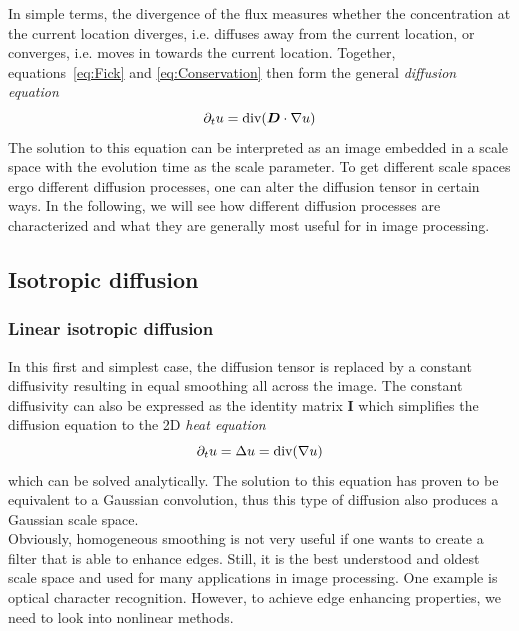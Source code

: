 In simple terms, the divergence of the flux measures whether the concentration at the current
location diverges, i.e. diffuses away from the current location, or converges, i.e. moves in
towards the current location.
Together, equations~\eqref{eq:Fick} and \eqref{eq:Conservation} then form the general \textit{diffusion
    equation}\cite{dic, weickert96}
\begin{equation}
    \partial_t u = \textnormal{div}(\boldsymbol D\cdot\mathbf{\nabla} u)\label{eq:Diffusion}
\end{equation}
The solution to this equation can be interpreted as an image embedded in a scale space with the
evolution time as the scale parameter. To get different scale spaces ergo different diffusion
processes, one can alter the diffusion tensor in certain ways.
In the following, we will see how different diffusion processes are characterized and what they are
generally most useful for in image processing.

\subsection{Isotropic diffusion}
\subsubsection*{Linear isotropic diffusion}
In this first and simplest case, the diffusion tensor is replaced by a constant diffusivity
resulting in equal smoothing all across the image. The constant diffusivity can also be expressed
as the identity matrix $\boldsymbol I$ which simplifies the diffusion equation to the 2D\textit{
heat equation}
\begin{equation}
    \partial_t u = \Delta u = \textnormal{div}(\mathbf{\nabla} u)\label{eq:IsoDiff}
\end{equation}
which can be solved analytically. The solution to this equation has proven to be equivalent to
a Gaussian convolution, thus this type of diffusion also produces a Gaussian scale space.\\
Obviously, homogeneous smoothing is not very useful if one wants to create a filter that is able to
enhance edges. Still, it is the best understood and oldest scale space and used for many
applications in image processing. One example is optical character recognition.
However, to achieve edge enhancing properties, we need to look into nonlinear methods.

